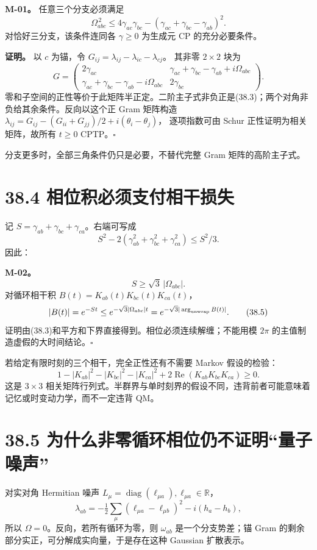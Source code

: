 \documentclass[
  11pt,
  oneside]{book}
\begin{document}
\protect\hypertarget{m-01}{}{}

\textbf{M-01。} 任意三个分支必须满足 \[
\boxed{\ 
\Omega_{abc}^{\,2}
\le
4\gamma_{ac}\gamma_{bc}
-(\gamma_{ac}+\gamma_{bc}-\gamma_{ab})^2.\ }
\tag{38.3}
\] 对恰好三分支，该条件连同各 \(\gamma\ge0\) 为生成元 CP
的充分必要条件。

\textbf{证明。} 以 \(c\) 为锚，令
\(G_{ij}=\lambda_{ij}-\lambda_{ic}-\lambda_{cj}\)。 其非零 \(2\times2\)
块为 \[
G=
\begin{pmatrix}
2\gamma_{ac}&
\gamma_{ac}+\gamma_{bc}-\gamma_{ab}+i\Omega_{abc}\\
\gamma_{ac}+\gamma_{bc}-\gamma_{ab}-i\Omega_{abc}&
2\gamma_{bc}
\end{pmatrix}.
\]
零和子空间的正性等价于此矩阵半正定。二阶主子式非负正是(38.3)；两个对角非负给其余条件。反向以这个正
Gram 矩阵构造
\(\lambda_{ij}=G_{ij}-(G_{ii}+G_{jj})/2+i(\theta_i-\theta_j)\)，
逐项指数可由 Schur 正性证明为相关矩阵，故所有 \(t\ge0\)
CPTP。\(\square\)

分支更多时，全部三角条件仍只是必要，不替代完整 Gram 矩阵的高阶主子式。

\section{38.4 相位积必须支付相干损失}

记 \(S=\gamma_{ab}+\gamma_{bc}+\gamma_{ca}\)。右端可写成 \[
S^2-2(\gamma_{ab}^2+\gamma_{bc}^2+\gamma_{ca}^2)\le S^2/3.
\] 因此：

\protect\hypertarget{m-02}{}{}

\textbf{M-02。} \[
S\ge\sqrt3\,|\Omega_{abc}|.
\tag{38.4}
\] 对循环相干积 \(B(t)=K_{ab}(t)K_{bc}(t)K_{ca}(t)\)， \[
|B(t)|=e^{-St}
\le e^{-\sqrt3|\Omega_{abc}|t}
=e^{-\sqrt3|\arg_{\rm unwrap} B(t)|}.
\tag{38.5}
\] 证明由(38.3)和平方和下界直接得到。相位必须连续解缠；不能用模 \(2\pi\)
的主值制造虚假的大时间结论。\(\square\)

若给定有限时刻的三个相干，完全正性还有不需要 Markov 假设的检验： \[
1-|K_{ab}|^2-|K_{bc}|^2-|K_{ca}|^2
+2\operatorname{Re}(K_{ab}K_{bc}K_{ca})\ge0.
\tag{38.6}
\] 这是 \(3\times3\)
相关矩阵行列式。半群界与单时刻界的假设不同，违背前者可能意味着记忆或时变动力学，而不一定违背
QM。

\section{38.5 为什么非零循环相位仍不证明``量子噪声''}

对实对角 Hermitian 噪声
\(L_\mu=\operatorname{diag}(\ell_{\mu a}),\ell_{\mu a}\in\mathbb R\)，
\[
\lambda_{ab}=-\tfrac12\sum_\mu(\ell_{\mu a}-\ell_{\mu b})^2
-i(h_a-h_b),
\] 所以 \(\Omega=0\)。反向，若所有循环为零，则 \(\omega_{ab}\)
是一个分支势差；锚 Gram 的剩余部分实正，可分解成实向量，于是存在这种
Gaussian 扩散表示。
\end{document}
